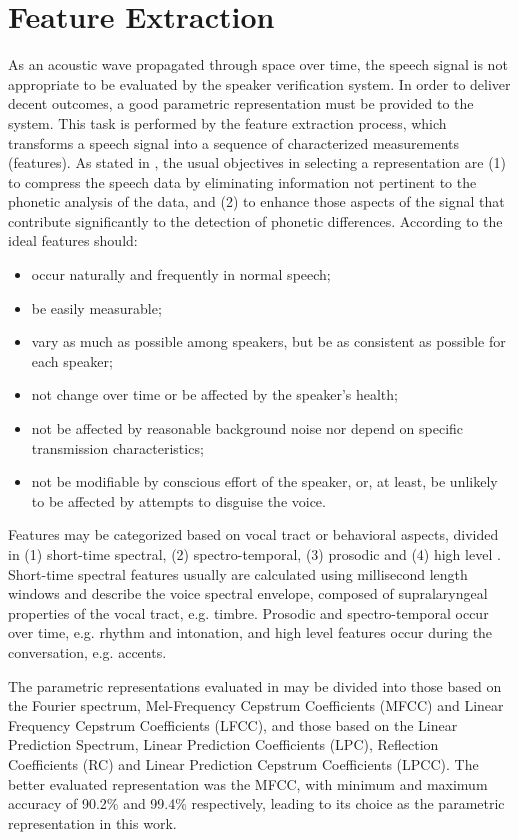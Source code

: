 \chapter{Feature Extraction}

As an acoustic wave propagated through space over time, the speech signal is not
appropriate to be evaluated by the speaker verification system. In order to deliver
decent outcomes, a good parametric representation must be provided to the system.
This task is performed by the feature extraction process, which transforms a speech
signal into a sequence of characterized measurements (features). As stated in
\autocite{davis.mermelstein.1980}, the usual objectives in selecting a representation
are (1) to compress the speech data by eliminating information not pertinent to
the phonetic analysis of the data, and (2) to enhance those aspects of the signal
that contribute significantly to the detection of phonetic differences. According
to \autocite{wolf.1972} the ideal features should:

\begin{itemize}\itemsep0pt\parskip0pt
    \item occur naturally and frequently in normal speech;
    \item be easily measurable;
    \item vary as much as possible among speakers, but be as consistent as possible
    for each speaker;
    \item not change over time or be affected by the speaker's health;
    \item not be affected by reasonable background noise nor depend on specific
    transmission characteristics;
    \item not be modifiable by conscious effort of the speaker, or, at least, be
    unlikely to be affected by attempts to disguise the voice.
\end{itemize}

Features may be categorized based on vocal tract or behavioral aspects, divided
in (1) short-time spectral, (2) spectro-temporal, (3) prosodic and (4) high
level \autocite{pinheiro.2013}. Short-time spectral features usually are calculated
using millisecond length windows and describe the voice spectral envelope, composed
of supralaryngeal properties of the vocal tract, e.g. timbre. Prosodic and
spectro-temporal occur over time, e.g. rhythm and intonation, and high level features
occur during the conversation, e.g. accents.

The parametric representations evaluated in \autocite{davis.mermelstein.1980} may
be divided into those based on the Fourier spectrum, Mel-Frequency Cepstrum
Coefficients (MFCC) and Linear Frequency Cepstrum Coefficients (LFCC), and those
based on the Linear Prediction Spectrum, Linear Prediction Coefficients (LPC),
Reflection Coefficients (RC) and Linear Prediction Cepstrum Coefficients (LPCC).
The better evaluated representation was the MFCC, with minimum and maximum accuracy
of 90.2\% and 99.4\% respectively, leading to its choice as the parametric
representation in this work.


